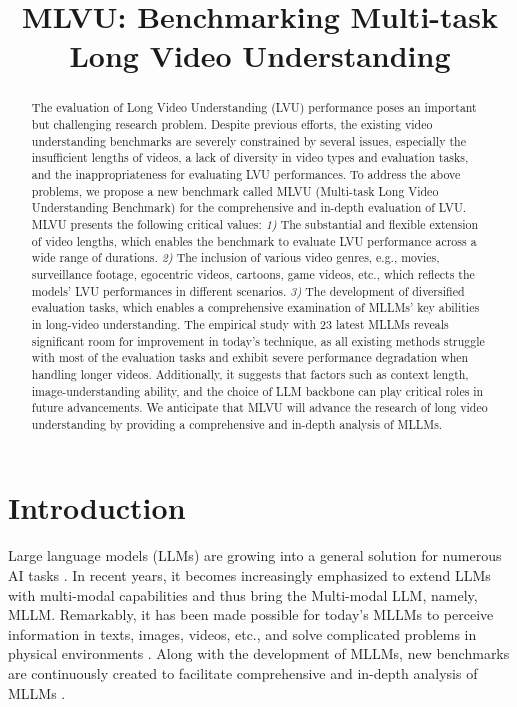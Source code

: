 \title{MLVU: Benchmarking Multi-task Long Video Understanding}



\maketitle
\begin{abstract}
   The evaluation of Long Video Understanding (LVU) performance poses an important but challenging research problem. Despite previous efforts, the existing video understanding benchmarks are severely constrained by several issues, especially the insufficient lengths of videos, a lack of diversity in video types and evaluation tasks, and the inappropriateness for evaluating LVU performances. To address the above problems, we propose a new benchmark called MLVU (Multi-task Long Video Understanding Benchmark) for the comprehensive and in-depth evaluation of LVU. MLVU presents the following critical values: \textit{1)} The substantial and flexible extension of video lengths, which enables the benchmark to evaluate LVU performance across a wide range of durations. \textit{2)} The inclusion of various video genres, e.g., movies, surveillance footage, egocentric videos, cartoons, game videos, etc., which reflects the models' LVU performances in different scenarios. \textit{3)} The development of diversified evaluation tasks, which enables a comprehensive examination of MLLMs' key abilities in long-video understanding. The empirical study with 23 latest MLLMs reveals significant room for improvement in today's technique, as all existing methods struggle with most of the evaluation tasks and exhibit severe performance degradation when handling longer videos. Additionally, it suggests that factors such as context length, image-understanding ability, and the choice of LLM backbone can play critical roles in future advancements. We anticipate that MLVU will advance the research of long video understanding by providing a comprehensive and in-depth analysis of MLLMs. 

\end{abstract}
\vspace{-0.3cm}\vspace{-0.3cm}
\section{Introduction}
\label{intro}

Large language models (LLMs) are growing into a general solution for numerous AI tasks \cite{brown2020language,touvron2023llama}. In recent years, it becomes increasingly emphasized to extend LLMs with multi-modal capabilities and thus bring the Multi-modal LLM, namely, MLLM. Remarkably, it has been made possible for today's MLLMs to perceive information in texts, images, videos, etc., and solve complicated problems in physical environments \cite{achiam2023gpt,team2023gemini}. Along with the development of MLLMs, new benchmarks are continuously created to facilitate comprehensive and in-depth analysis of MLLMs \cite{yue2023mmmu,liu2023mmbench,fu2023mme,mvbench2023}. 

